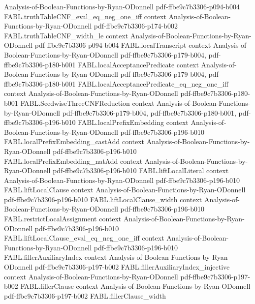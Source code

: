 \begin{theorem}
  {Analysis-of-Boolean-Functions-by-Ryan-ODonnell}
  {pdf-ffbe9c7b3306-p094-b004}
\proofstep
  {FABL.truthTableCNF_eval_eq_neg_one_iff}
  {context}
  {Analysis-of-Boolean-Functions-by-Ryan-ODonnell}
  {pdf-ffbe9c7b3306-p174-b002}
\proofstep
  {FABL.truthTableCNF_width_le}
  {context}
  {Analysis-of-Boolean-Functions-by-Ryan-ODonnell}
  {pdf-ffbe9c7b3306-p094-b004}
\proofstep
  {FABL.localTranscript}
  {context}
  {Analysis-of-Boolean-Functions-by-Ryan-ODonnell}
  {pdf-ffbe9c7b3306-p179-b004,
    pdf-ffbe9c7b3306-p180-b001}
\proofstep
  {FABL.localAcceptancePredicate}
  {context}
  {Analysis-of-Boolean-Functions-by-Ryan-ODonnell}
  {pdf-ffbe9c7b3306-p179-b004,
    pdf-ffbe9c7b3306-p180-b001}
\proofstep
  {FABL.localAcceptancePredicate_eq_neg_one_iff}
  {context}
  {Analysis-of-Boolean-Functions-by-Ryan-ODonnell}
  {pdf-ffbe9c7b3306-p180-b001}
\proofstep
  {FABL.SeedwiseThreeCNFReduction}
  {context}
  {Analysis-of-Boolean-Functions-by-Ryan-ODonnell}
  {pdf-ffbe9c7b3306-p179-b004,
    pdf-ffbe9c7b3306-p180-b001,
    pdf-ffbe9c7b3306-p196-b010}
\proofstep
  {FABL.localPrefixEmbedding}
  {context}
  {Analysis-of-Boolean-Functions-by-Ryan-ODonnell}
  {pdf-ffbe9c7b3306-p196-b010}
\proofstep
  {FABL.localPrefixEmbedding_castAdd}
  {context}
  {Analysis-of-Boolean-Functions-by-Ryan-ODonnell}
  {pdf-ffbe9c7b3306-p196-b010}
\proofstep
  {FABL.localPrefixEmbedding_natAdd}
  {context}
  {Analysis-of-Boolean-Functions-by-Ryan-ODonnell}
  {pdf-ffbe9c7b3306-p196-b010}
\proofstep
  {FABL.liftLocalLiteral}
  {context}
  {Analysis-of-Boolean-Functions-by-Ryan-ODonnell}
  {pdf-ffbe9c7b3306-p196-b010}
\proofstep
  {FABL.liftLocalClause}
  {context}
  {Analysis-of-Boolean-Functions-by-Ryan-ODonnell}
  {pdf-ffbe9c7b3306-p196-b010}
\proofstep
  {FABL.liftLocalClause_width}
  {context}
  {Analysis-of-Boolean-Functions-by-Ryan-ODonnell}
  {pdf-ffbe9c7b3306-p196-b010}
\proofstep
  {FABL.restrictLocalAssignment}
  {context}
  {Analysis-of-Boolean-Functions-by-Ryan-ODonnell}
  {pdf-ffbe9c7b3306-p196-b010}
\proofstep
  {FABL.liftLocalClause_eval_eq_neg_one_iff}
  {context}
  {Analysis-of-Boolean-Functions-by-Ryan-ODonnell}
  {pdf-ffbe9c7b3306-p196-b010}
\proofstep
  {FABL.fillerAuxiliaryIndex}
  {context}
  {Analysis-of-Boolean-Functions-by-Ryan-ODonnell}
  {pdf-ffbe9c7b3306-p197-b002}
\proofstep
  {FABL.fillerAuxiliaryIndex_injective}
  {context}
  {Analysis-of-Boolean-Functions-by-Ryan-ODonnell}
  {pdf-ffbe9c7b3306-p197-b002}
\proofstep
  {FABL.fillerClause}
  {context}
  {Analysis-of-Boolean-Functions-by-Ryan-ODonnell}
  {pdf-ffbe9c7b3306-p197-b002}
\proofstep
  {FABL.fillerClause_width}

\end{theorem}
